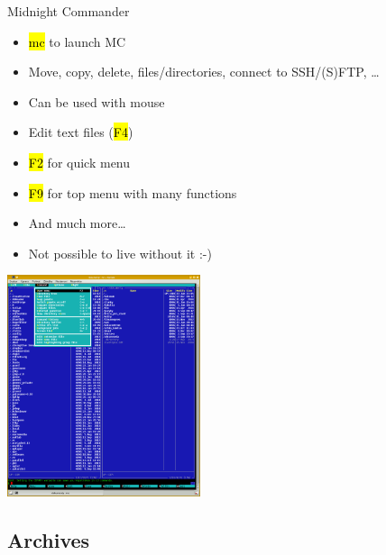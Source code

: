 \documentclass[compress, ucs, xelatex, 11pt, xcolor=svgnames,
  hyperref={
    bookmarks=true,
    unicode=true,
    colorlinks=true,
    pdftitle={Linux, command line and MetaCentrum},
    plainpages=false,
    pdfauthor={Vojtech Zeisek},
    pdfsubject={Course about use of Linux command line, writing shell scripts and using MetaCentrum of CESNET},
    pdfcreator={XeLaTeX},
    pdfkeywords={Linux, GNU, BASH, shell, command line, MetaCentrum},
    linkcolor=Red,
    anchorcolor=Blue,
    citecolor=Purple,
    filecolor=DodgerBlue,
    menucolor=DarkOrchid,
    urlcolor=DeepSkyBlue,
    pdftex},
  url={hyphens, lowtilde} %
  ]{beamer}
\renewcommand{\texttt}[1]{\hl{\ttfamily #1}}
\begin{document}
\begin{frame}{Midnight Commander}
\begin{multicols}{2}
\begin{itemize}
  \item \texttt{mc} to launch MC
  \item Move, copy, delete, files/directories, connect to SSH/(S)FTP, \ldots
  \item Can be used with mouse
  \item Edit text files (\texttt{F4})
  \item \texttt{F2} for quick menu
  \item \texttt{F9} for top menu with many functions
  \item And much more\ldots
  \item Not possible to live without it :-)
\end{itemize}
\includegraphics[height=6.5cm]{mc.png}
\end{multicols}
\end{frame}

\subsection{Archives}
\end{document}

